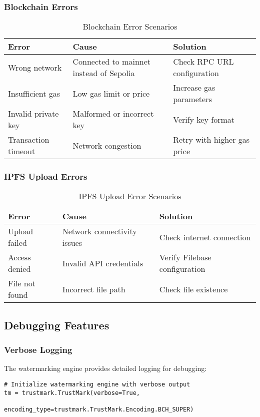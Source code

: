 \documentclass[12pt,a4paper]{article}
\begin{document}
\subsubsection{Blockchain Errors}
\begin{table}[H]
\centering
\begin{tabular}{@{}p{4cm}p{6cm}p{4cm}@{}}
\toprule
\textbf{Error} & \textbf{Cause} & \textbf{Solution} \\
\midrule
Wrong network & Connected to mainnet instead of Sepolia & Check RPC URL configuration \\
Insufficient gas & Low gas limit or price & Increase gas parameters \\
Invalid private key & Malformed or incorrect key & Verify key format \\
Transaction timeout & Network congestion & Retry with higher gas price \\
\bottomrule
\end{tabular}
\caption{Blockchain Error Scenarios}
\end{table}

\subsubsection{IPFS Upload Errors}
\begin{table}[H]
\centering
\begin{tabular}{@{}p{4cm}p{6cm}p{4cm}@{}}
\toprule
\textbf{Error} & \textbf{Cause} & \textbf{Solution} \\
\midrule
Upload failed & Network connectivity issues & Check internet connection \\
Access denied & Invalid API credentials & Verify Filebase configuration \\
File not found & Incorrect file path & Check file existence \\
\bottomrule
\end{tabular}
\caption{IPFS Upload Error Scenarios}
\end{table}

\subsection{Debugging Features}

\subsubsection{Verbose Logging}
The watermarking engine provides detailed logging for debugging:
\begin{lstlisting}[caption=Verbose Logging Configuration]
# Initialize watermarking engine with verbose output
tm = trustmark.TrustMark(verbose=True, 
                       encoding_type=trustmark.TrustMark.Encoding.BCH_SUPER)
\end{lstlisting}
\end{document}

